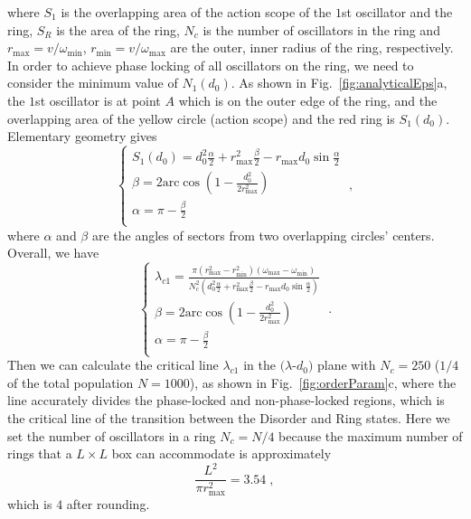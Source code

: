 \documentclass[%
 aip,
 amsmath,amssymb,
 reprint,%
]{revtex4-1}
\begin{document}
where $S_1$ is the overlapping area of the action scope of the $1$st oscillator and the ring, $S_R$ is the area of the ring, $N_c$ is the number of oscillators in the ring and $r_{\max}=v/\omega_{\min}$, $r_{\min}=v/\omega_{\max}$ are the outer, inner radius of the ring, respectively. In order to achieve phase locking of all oscillators on the ring, we need to consider the minimum value of $N_1\left( d_0\right)$. As shown in Fig.~\ref{fig:analyticalEps}a, the $1$st oscillator is at point $A$ which is on the outer edge of the ring, and the overlapping area of the yellow circle (action scope) and the red ring is $S_1\left( d_0 \right)$.  Elementary geometry gives 
\begin{equation}\label{eq:S1}
    \begin{cases}
        S_1\left( d_0 \right) =d_{0}^{2}\frac{\alpha}{2}+r_{\max}^{2}\frac{\beta}{2}-r_{\max}d_0\sin \frac{\alpha}{2}\\
        \beta =2\mathrm{arc}\cos \left( 1-\frac{d_{0}^{2}}{2r_{\max}^{2}} \right)\\
        \alpha =\pi -\frac{\beta}{2}\\
    \end{cases}\;,
\end{equation}
where $\alpha$ and $\beta$ are the angles of sectors from two overlapping circles' centers. Overall, we have
\begin{equation}
    \begin{cases}
        \lambda _{c1}=\frac{\pi \left( r_{\max}^{2}-r_{\min}^{2} \right) \left( \omega _{\max}-\omega _{\min} \right)}{N_{c}^{2}\left( d_{0}^{2}\frac{\alpha}{2}+r_{\max}^{2}\frac{\beta}{2}-r_{\max}d_0\sin \frac{\alpha}{2} \right)}\\
        \beta =2\mathrm{arc}\cos \left( 1-\frac{d_{0}^{2}}{2r_{\max}^{2}} \right)\\
        \alpha =\pi -\frac{\beta}{2}\\
    \end{cases}\;.
\end{equation}
Then we can calculate the critical line $\lambda_{c1}$ in the $(\lambda$-$d_0)$ plane with $N_c=250$ ($1/4$ of the total population $N=1000$), as shown in Fig.~\ref{fig:orderParam}c, where the line accurately divides the phase-locked and non-phase-locked regions, which is the critical line of the transition between the Disorder and Ring states. Here we set the number of oscillators in a ring $N_c=N/4$ because the maximum number of rings that a $L\times L$ box can accommodate is approximately
\begin{equation}
    \frac{L^2}{\pi r_{\max}^{2}}=3.54\;,
\end{equation}
which is $4$ after rounding.
\end{document}

